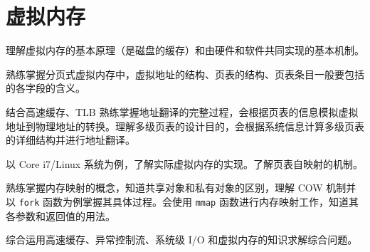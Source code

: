 \chapter{虚拟内存}\thispagestyle{empty}
    \begin{summary}
        \begin{compactitem}
            \item 理解虚拟内存的基本原理（是磁盘的缓存）和由硬件和软件共同实现的基本机制。
            \item 熟练掌握分页式虚拟内存中，虚拟地址的结构、页表的结构、页表条目一般要包括的各字段的含义。
            \item 结合高速缓存、TLB 熟练掌握地址翻译的完整过程，会根据页表的信息模拟虚拟地址到物理地址的转换。理解多级页表的设计目的，会根据系统信息计算多级页表的详细结构并进行地址翻译。
            \item 以 Core i7/Linux 系统为例，了解实际虚拟内存的实现。了解页表自映射的机制。
            \item 熟练掌握内存映射的概念，知道共享对象和私有对象的区别，理解 COW 机制并以 \verb|fork| 函数为例掌握其具体过程。会使用 \verb|mmap| 函数进行内存映射工作，知道其各参数和返回值的用法。
            \item 综合运用高速缓存、异常控制流、系统级 I/O 和虚拟内存的知识求解综合问题。
        \end{compactitem}
    \end{summary}

